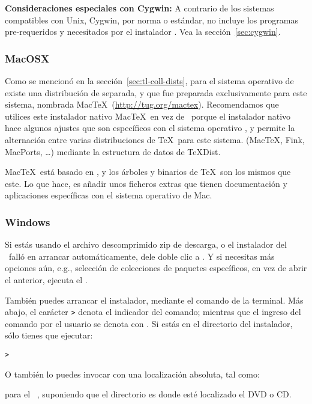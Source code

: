 \documentclass{article}
\begin{document}
\textbf{Consideraciones especiales con Cygwin:} A contrario de los
sistemas compatibles con Unix, Cygwin, por norma o estándar, no
incluye los programas pre-requeridos y necesitados por el instalador
\TL{}. Vea la sección~\ref{sec:cygwin}.

\subsubsection{MacOSX}
\label{sec:macosx}

Como se mencionó en la sección~\ref{sec:tl-coll-dists}, para el
sistema operativo de \MacOSX existe una distribución de \TL{} separada, 
y que fue preparada exclusivamente para este sistema, nombrada
Mac\TeX\ (\url{http://tug.org/mactex}).  Recomendamos que utilices
este instalador nativo Mac\TeX\ en vez de \TL\, porque el instalador
nativo hace algunos ajustes que son específicos con el sistema
operativo \MacOSX, y permite la alternación entre varias
distribuciones de \TeX\ para este sistema. (Mac\TeX, Fink, MacPorts,
\ldots) mediante la estructura de datos de \TeX{}Dist.

Mac\TeX\ está basado en \TL, y los árboles y binarios de \TeX\ son los mismos que
este. Lo que hace, es añadir unos ficheros extras que tienen documentación y
aplicaciones específicas con el sistema operativo de Mac.

\subsubsection{Windows}\label{sec:wininst}

Si estás usando el archivo descomprimido zip de descarga, o el
instalador del \DVD\ falló en arrancar automáticamente, dele doble
clic a . Y si necesitas más opciones
aún, e.g., selección de colecciones de paquetes específicos, en vez de
abrir el anterior, ejecuta el . 

También puedes arrancar el instalador, mediante el comando de la
terminal. Más abajo, el carácter \texttt{>} denota el indicador del comando;
mientras que el ingreso del comando por el usuario se denota con
. Si estás en el directorio del instalador, sólo
tienes que ejecutar:
\begin{alltt}
	> 
\end{alltt}

O también lo puedes invocar con una localización absoluta, tal como:
\begin{alltt}
\end{alltt}
para el \TK\ \DVD, suponiendo que el directorio  es donde
esté localizado el \textsc{DVD} o \textsc{CD}.
\end{document}
